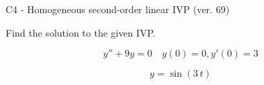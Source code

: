\begin{exercise}
  \begin{exerciseTitle}C4 - Homogeneous second-order linear IVP (ver. 69)\end{exerciseTitle}
  \begin{exerciseStatement}
    
Find the solution to the given IVP.

    
\[y''+9y = 0 \hspace{1em} y(0) = 0 , y'(0) = 3\]

  \end{exerciseStatement}
  \begin{exerciseAnswer}
    
\[y= \sin\left(3 \, t\right)\]

  \end{exerciseAnswer}
\end{exercise}